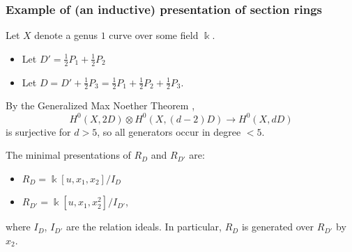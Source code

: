 \documentclass[handout]{beamer}
\numberwithin{equation}{section}
\numberwithin{case}{theorem}
\newcommand{\<}{\left\langle}
\renewcommand{\>}{\right\rangle}
\begin{document}
	\begin{frame}
		\frametitle{Example of (an inductive) presentation of section rings}
		\begin{example}
			Let $X$ denote a genus $1$ curve over some field $\Bbbk.$ \pause
			\begin{itemize}
				\item[]\cite[Example $5.7.7$]{VZB} Let $D'=\frac{1}{2}P_1+\frac{1}{2}P_2$ \pause
				\item[]\cite[Example $5.7.9$]{VZB} Let $D=D'+\frac{1}{2}P_3=\frac{1}{2}P_1+\frac{1}{2}P_2+\frac{1}{2}P_3$. \pause
			\end{itemize}
			By the Generalized Max Noether Theorem \cite[Lemma 3.1.4]{VZB}, 
			\[H^0(X,2D)\otimes H^0(X,(d-2)D)\to H^0(X,dD)\] is surjective for $d>5$, so all generators occur in degree $<5$. \pause
			
			The minimal presentations of $R_D$ and $R_{D'}$ are:
			\begin{itemize}
				\item[] $R_D = \Bbbk[u,x_1,x_2]/I_D$ \pause
				\item[] $R_{D'} = \Bbbk[u,x_1,x_2^2]/I_{D'}$, \pause
			\end{itemize} 
			where $I_D$, $I_{D'}$ are the relation ideals. \pause In particular, $R_D$ is generated over $R_{D'}$ by $x_2$.
		\end{example}
	\end{frame}
	
\end{document}
